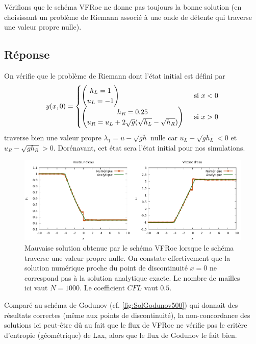 \documentclass[
	french,
	11pt, %
]{fphw}
\newcommand{\myvec}[2]{\begin{pmatrix} #1  \\ #2 \end{pmatrix}}   %
\newcommand{\hquad}{\hspace{0.5em}} %
\begin{document}
\begin{problem}
Vérifions que le schéma VFRoe ne donne pas toujours la bonne solution (en choisissant un problème de Riemann associé à une onde de détente qui traverse une valeur propre nulle).
\end{problem}

\subsection*{Réponse} 

On vérifie que le problème de Riemann dont l'état initial est défini par
\begin{align*}
	y(x,0) = \begin{cases}
		\myvec{h_L=1}{u_L=-1} \hquad &\text{si  } x < 0\\
		\myvec{h_R=0.25}{u_R=u_L + 2\sqrt{g}(\sqrt{h_L}-\sqrt{h_R})} \hquad &\text{si  } x > 0 
	\end{cases}
\end{align*}
traverse bien une valeur propre $\lambda_1 = u-\sqrt{gh}$ nulle car $u_L-\sqrt{gh_L} < 0$ et $u_R-\sqrt{gh_R} > 0$. Dorénavant, cet état sera l'état initial pour nos simulations.

\begin{figure}[H]
	\centering
	\includegraphics[width=\textwidth]{VFRoePointSonique.png}
	\caption{Mauvaise solution obtenue par le schéma VFRoe lorsque le schéma traverse une valeur propre nulle. On constate effectivement que la solution numérique proche du point de discontinuité $x=0$ ne correspond pas à la solution analytique exacte. Le nombre de mailles ici vaut $N=1000$. Le coefficient $CFL$ vaut $0.5$.}
	\label{fig:VFRoePasNormal}
\end{figure}
\noindent Comparé au schéma de Godunov (cf. \cref{fig:SolGodunov500}) qui donnait des résultats correctes (même aux points de discontinuité), la non-concordance des solutions ici peut-être dû au fait que le flux de VFRoe ne vérifie pas le critère d'entropie (géométrique) de Lax, alors que le flux de Godunov le fait bien.  
\end{document}
